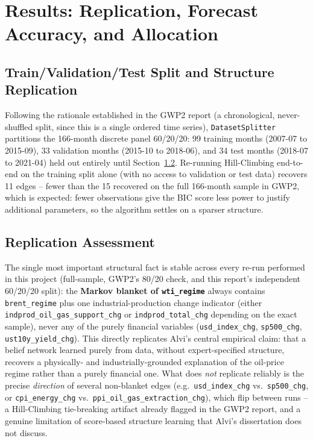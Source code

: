 \section{Results: Replication, Forecast Accuracy, and Allocation}
\label{sec:results}

\subsection{Train/Validation/Test Split and Structure Replication}

Following the rationale established in the GWP2 report (a chronological,
never-shuffled split, since this is a single ordered time series),
\texttt{DatasetSplitter} partitions the 166-month discrete panel 60/20/20:
99 training months (2007-07 to 2015-09), 33 validation months (2015-10
to 2018-06), and 34 test months (2018-07 to 2021-04) held out entirely
until Section~\ref{sec:replication-assessment}. Re-running Hill-Climbing
end-to-end on the training split alone (with no access to validation or
test data) recovers 11 edges -- fewer than the 15 recovered on the full
166-month sample in GWP2, which is expected: fewer observations give the
BIC score less power to justify additional parameters, so the algorithm
settles on a sparser structure.

\subsection{Replication Assessment}
\label{sec:replication-assessment}

The single most important structural fact is stable across every
re-run performed in this project (full-sample, GWP2's 80/20 check, and
this report's independent 60/20/20 split): the \textbf{Markov blanket of
\texttt{wti\_regime}} always contains \texttt{brent\_regime} plus one
industrial-production change indicator (either
\texttt{indprod\_oil\_gas\_support\_chg} or \texttt{indprod\_total\_chg}
depending on the exact sample), never any of the purely financial
variables (\texttt{usd\_index\_chg}, \texttt{sp500\_chg},
\texttt{ust10y\_yield\_chg}). This directly replicates Alvi's central
empirical claim: that a belief network learned purely from data,
without expert-specified structure, recovers a physically- and
industrially-grounded explanation of the oil-price regime rather than a
purely financial one. What does \emph{not} replicate reliably is the
precise \emph{direction} of several non-blanket edges (e.g.\
\texttt{usd\_index\_chg} vs.\ \texttt{sp500\_chg}, or
\texttt{cpi\_energy\_chg} vs.\ \texttt{ppi\_oil\_gas\_extraction\_chg}),
which flip between runs -- a Hill-Climbing tie-breaking artifact already
flagged in the GWP2 report, and a genuine limitation of score-based
structure learning that Alvi's dissertation does not discuss.

